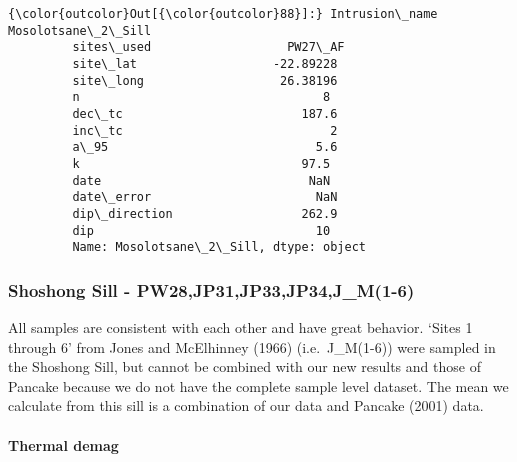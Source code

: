 \documentclass{article}
\begin{document}
            \begin{Verbatim}[commandchars=\\\{\}]
{\color{outcolor}Out[{\color{outcolor}88}]:} Intrusion\_name    Mosolotsane\_2\_Sill
         sites\_used                   PW27\_AF
         site\_lat                   -22.89228
         site\_long                   26.38196
         n                                  8
         dec\_tc                         187.6
         inc\_tc                             2
         a\_95                             5.6
         k                               97.5
         date                             NaN
         date\_error                       NaN
         dip\_direction                  262.9
         dip                               10
         Name: Mosolotsane\_2\_Sill, dtype: object
\end{Verbatim}
        
    \subsubsection{Shoshong Sill -
PW28,JP31,JP33,JP34,J\_M(1-6)}\label{shoshong-sill---pw28jp31jp33jp34jux5fm1-6}

    All samples are consistent with each other and have great behavior.
`Sites 1 through 6' from Jones and McElhinney (1966) (i.e.~J\_M(1-6))
were sampled in the Shoshong Sill, but cannot be combined with our new
results and those of Pancake because we do not have the complete sample
level dataset. The mean we calculate from this sill is a combination of
our data and Pancake (2001) data.

    \paragraph{Thermal demag}\label{thermal-demag}
\end{document}
